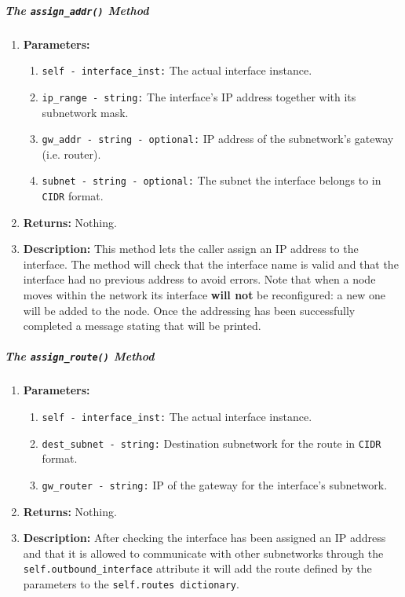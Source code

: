         \subparagraph{The \texttt{assign\_addr()} Method}
            \begin{enumerate}
                \item \textbf{Parameters:}
                \begin{enumerate}
                    \item \texttt{self - interface\_inst:} The actual interface instance.
                    \item \texttt{ip\_range - string:} The interface's IP address together with its subnetwork mask.
                    \item \texttt{gw\_addr - string - optional:} IP address of the subnetwork's gateway (i.e. router).
                    \item \texttt{subnet - string - optional:} The subnet the interface belongs to in \texttt{CIDR} format.
                \end{enumerate}
                \item \textbf{Returns:} Nothing.
                \item \textbf{Description:} This method lets the caller assign an IP address to the interface. The method will check that the interface name is valid and that the interface had no previous address to avoid errors. Note that when a node moves within the network its interface \textbf{will not} be reconfigured: a new one will be added to the node. Once the addressing has been successfully completed a message stating that will be printed.
            \end{enumerate}

        \subparagraph{The \texttt{assign\_route()} Method}
            \begin{enumerate}
                \item \textbf{Parameters:}
                \begin{enumerate}
                    \item \texttt{self - interface\_inst:} The actual interface instance.
                    \item \texttt{dest\_subnet - string:} Destination subnetwork for the route in \texttt{CIDR} format.
                    \item \texttt{gw\_router - string:} IP of the gateway for the interface's subnetwork.
                \end{enumerate}
                \item \textbf{Returns:} Nothing.
                \item \textbf{Description:} After checking the interface has been assigned an IP address and that it is allowed to communicate with other subnetworks through the \texttt{self.outbound\_interface} attribute it will add the route defined by the parameters to the \texttt{self.routes dictionary}.
            \end{enumerate}


